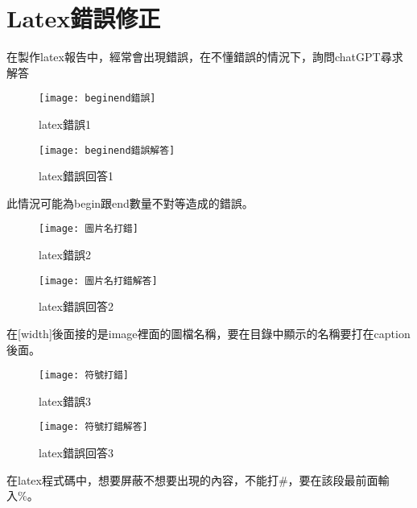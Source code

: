 \chapter{Latex錯誤修正}
在製作latex報告中，經常會出現錯誤，在不懂錯誤的情況下，詢問chatGPT尋求解答\\

\begin{figure}[ht]
  \begin{minipage}{0.5\textwidth}
    \centering
    \texttt{[image: beginend錯誤]}
    \caption{latex錯誤1}
  \end{minipage}%
  \begin{minipage}{0.5\textwidth}
    \centering
    \texttt{[image: beginend錯誤解答]}
    \caption{latex錯誤回答1}
  \end{minipage}
\end{figure}

此情況可能為begin跟end數量不對等造成的錯誤。\\

\begin{figure}[ht]
  \begin{minipage}{0.5\textwidth}
    \centering
    \texttt{[image: 圖片名打錯]}
    \caption{latex錯誤2}
  \end{minipage}%
  \begin{minipage}{0.5\textwidth}
    \centering
    \texttt{[image: 圖片名打錯解答]}
    \caption{latex錯誤回答2}
  \end{minipage}
\end{figure}

在[width]後面接的是image裡面的圖檔名稱，要在目錄中顯示的名稱要打在caption後面。\\

\begin{figure}[ht]
  \begin{minipage}{0.5\textwidth}
    \centering
    \texttt{[image: 符號打錯]}
    \caption{latex錯誤3}
  \end{minipage}%
  \begin{minipage}{0.5\textwidth}
    \centering
    \texttt{[image: 符號打錯解答]}
    \caption{latex錯誤回答3}
  \end{minipage}
\end{figure}

在latex程式碼中，想要屏蔽不想要出現的內容，不能打\#，要在該段最前面輸入\%。\\

